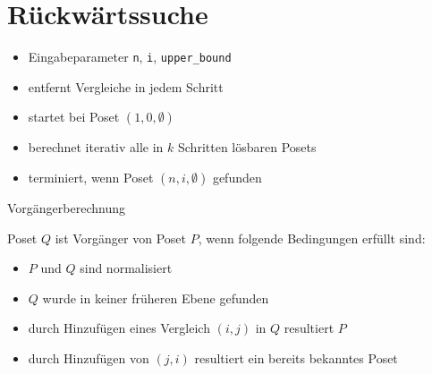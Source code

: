 \section{Rückwärtssuche}
\sectionframe{\insertsection}
\begin{frame}{\insertsection}
  \begin{itemize}
    \item<+-> Eingabeparameter \texttt{n}, \texttt{i}, \texttt{upper\_bound}
    \item<+-> entfernt Vergleiche in jedem Schritt
    \item<+-> startet bei Poset $(1, 0, \emptyset)$ %
    \item<+-> berechnet iterativ alle in $k$ Schritten lösbaren Posets %
    \item<+-> terminiert, wenn Poset $(n, i, \emptyset)$ gefunden %
  \end{itemize}
\end{frame}

\begin{frame}{Vorgängerberechnung}
  \begin{definition}[Vorgänger]
    Poset $Q$ ist Vorgänger von Poset $P$, wenn folgende Bedingungen erfüllt sind:
    \begin{itemize}
      \item<+-> $P$ und $Q$ sind normalisiert %
      \item<+-> $Q$ wurde in keiner früheren Ebene gefunden %
      \item<+-> durch Hinzufügen eines Vergleich $(i, j)$ in $Q$ resultiert $P$ %
      \item<+-> durch Hinzufügen von $(j, i)$ resultiert ein bereits bekanntes Poset %
    \end{itemize}
  \end{definition}
\end{frame}


